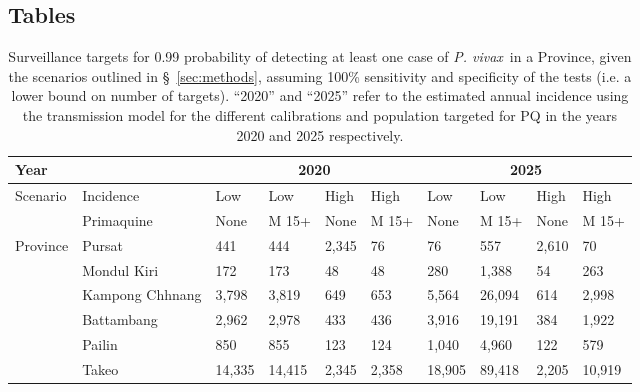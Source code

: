 \documentclass[doublespacing]{bmcart}
\newcommand{\pv}{\textit{P. vivax}}
\begin{document}
\begin{backmatter}

\section*{Tables}
\begin{table}[h!] 
\caption{Surveillance targets for 0.99 probability of detecting at least one case of \pv~in a Province, given the scenarios outlined in \S~\ref{sec:methods}, assuming 100\% sensitivity and specificity of the tests (i.e. a lower bound on number of targets). ``2020'' and ``2025'' refer to the estimated annual incidence using the transmission model for the different calibrations and population targeted for PQ in the years 2020 and 2025 respectively. }\label{tab:surveillance}
      \begin{tabular}{|l|l|l|l|l|l|l|l|l|l|}
       \hline 
       \multicolumn{2}{|l|}{Year} & \multicolumn{4}{|c|}{2020} & \multicolumn{4}{|c|}{2025} \\ \hline
       \multirow{2}{*}{Scenario} & Incidence & Low & Low & High & High & Low & Low & High & High \\ %
                                 & Primaquine & None & M 15+ & None & M 15+ & None & M 15+ & None & M 15+ \\ \hline
    \multirow{6}{*}{Province} & Pursat & 441 & 444 & 2,345 & 76 & 76 & 557 & 2,610 & 70 \\ %
                              & Mondul Kiri & 172 & 173 & 48 & 48 & 280 & 1,388 & 54 & 263 \\ %
                              & Kampong Chhnang & 3,798 & 3,819 & 649 & 653 & 5,564 & 26,094 & 614 & 2,998 \\ %
                              & Battambang & 2,962 & 2,978 & 433 & 436 & 3,916 & 19,191 & 384 & 1,922 \\ %
                              & Pailin & 850 & 855 & 123 & 124 & 1,040 & 4,960 & 122 & 579 \\ %
                              & Takeo & 14,335 & 14,415 & 2,345 & 2,358 & 18,905 & 89,418 & 2,205 & 10,919 \\ \hline 
      \end{tabular}
\end{table}



\end{backmatter}
\end{document}
